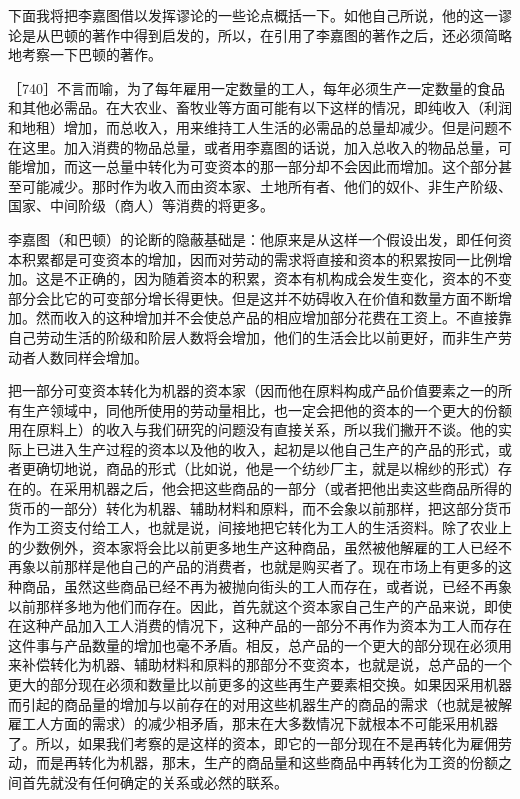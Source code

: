 下面我将把李嘉图借以发挥谬论的一些论点概括一下。如他自己所说，他的这一谬论是从巴顿的著作中得到启发的，所以，在引用了李嘉图的著作之后，还必须简略地考察一下巴顿的著作。

［740］不言而喻，为了每年雇用一定数量的工人，每年必须生产一定数量的食品和其他必需品。在大农业、畜牧业等方面可能有以下这样的情况，即纯收入（利润和地租）增加，而总收入，用来维持工人生活的必需品的总量却减少。但是问题不在这里。加入消费的物品总量，或者用李嘉图的话说，加入总收入的物品总量，可能增加，而这一总量中转化为可变资本的那一部分却不会因此而增加。这个部分甚至可能减少。那时作为收入而由资本家、土地所有者、他们的奴仆、非生产阶级、国家、中间阶级（商人）等消费的将更多。

李嘉图（和巴顿）的论断的隐蔽基础是：他原来是从这样一个假设出发，即任何资本积累都是可变资本的增加，因而对劳动的需求将直接和资本的积累按同一比例增加。这是不正确的，因为随着资本的积累，资本有机构成会发生变化，资本的不变部分会比它的可变部分增长得更快。但是这并不妨碍收入在价值和数量方面不断增加。然而收入的这种增加并不会使总产品的相应增加部分花费在工资上。不直接靠自己劳动生活的阶级和阶层人数将会增加，他们的生活会比以前更好，而非生产劳动者人数同样会增加。

把一部分可变资本转化为机器的资本家（因而他在原料构成产品价值要素之一的所有生产领域中，同他所使用的劳动量相比，也一定会把他的资本的一个更大的份额用在原料上）的收入与我们研究的问题没有直接关系，所以我们撇开不谈。他的实际上已进入生产过程的资本以及他的收入，起初是以他自己生产的产品的形式，或者更确切地说，商品的形式（比如说，他是一个纺纱厂主，就是以棉纱的形式）存在的。在采用机器之后，他会把这些商品的一部分（或者把他出卖这些商品所得的货币的一部分）转化为机器、辅助材料和原料，而不会象以前那样，把这部分货币作为工资支付给工人，也就是说，间接地把它转化为工人的生活资料。除了农业上的少数例外，资本家将会比以前更多地生产这种商品，虽然被他解雇的工人已经不再象以前那样是他自己的产品的消费者，也就是购买者了。现在市场上有更多的这种商品，虽然这些商品已经不再为被抛向街头的工人而存在，或者说，已经不再象以前那样多地为他们而存在。因此，首先就这个资本家自己生产的产品来说，即使在这种产品加入工人消费的情况下，这种产品的一部分不再作为资本为工人而存在这件事与产品数量的增加也毫不矛盾。相反，总产品的一个更大的部分现在必须用来补偿转化为机器、辅助材料和原料的那部分不变资本，也就是说，总产品的一个更大的部分现在必须和数量比以前更多的这些再生产要素相交换。如果因采用机器而引起的商品量的增加与以前存在的对用这些机器生产的商品的需求（也就是被解雇工人方面的需求）的减少相矛盾，那末在大多数情况下就根本不可能采用机器了。所以，如果我们考察的是这样的资本，即它的一部分现在不是再转化为雇佣劳动，而是再转化为机器，那末，生产的商品量和这些商品中再转化为工资的份额之间首先就没有任何确定的关系或必然的联系。

